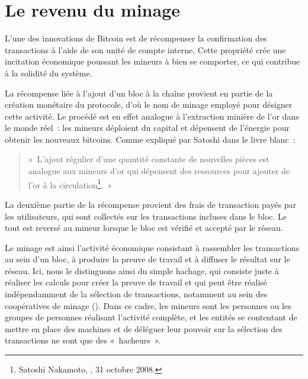 \section*{Le revenu du minage} %


L'une des innovations de Bitcoin est de récompenser la confirmation des transactions à l'aide de son unité de compte interne. Cette propriété crée une incitation économique poussant les mineurs à bien se comporter, ce qui contribue à la solidité du système.

La récompense liée à l'ajout d'un bloc à la chaîne provient en partie de la création monétaire du protocole, d'où le nom de minage employé pour désigner cette activité. Le procédé est en effet analogue à l'extraction minière de l'or dans le monde réel~: les mineurs déploient du capital et dépensent de l'énergie pour obtenir les nouveaux bitcoins. Comme expliqué par Satoshi dans le livre blanc~:

\begin{quote}
«~L'ajout régulier d'une quantité constante de nouvelles pièces est analogue aux mineurs d'or qui dépensent des ressources pour ajouter de l'or à la circulation\footnote{Satoshi Nakamoto, , 31 octobre 2008.}.~»
\end{quote}

La deuxième partie de la récompense provient des frais de transaction payés par les utilisateurs, qui sont collectés sur les transactions incluses dans le bloc. Le tout est reversé au mineur lorsque le bloc est vérifié et accepté par le réseau. %

Le minage est ainsi l'activité économique consistant à rassembler les transactions au sein d'un bloc, à produire la preuve de travail et à diffuser le résultat sur le réseau. Ici, nous le distinguons ainsi du simple hachage, qui consiste juste à réaliser les calculs pour créer la preuve de travail et qui peut être réalisé indépendamment de la sélection de transactions, notamment au sein des coopératives de minage (). Dans ce cadre, les mineurs sont les personnes ou les groupes de personnes réalisant l'activité complète, et les entités se contentant de mettre en place des machines et de déléguer leur pouvoir sur la sélection des transactions ne sont que des «~hacheurs~».


